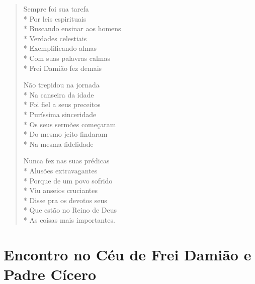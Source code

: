 \begin{verse}
Sempre foi sua tarefa\\*
Por leis espirituais\\*
Buscando ensinar aos homens\\*
Verdades celestiais\\*
Exemplificando almas\\*
Com suas palavras calmas\\*
Frei Damião fez demais

Não trepidou na jornada\\*
Na canseira da idade\\*
Foi fiel a seus preceitos\\*
Puríssima sinceridade\\*
Os seus sermões começaram\\*
Do mesmo jeito findaram\\*
Na mesma fidelidade

Nunca fez nas suas prédicas\\*
Alusões extravagantes\\*
Porque de um povo sofrido\\*
Viu anseios cruciantes\\*
Disse pra os devotos seus\\*
Que estão no Reino de Deus\\*
As coisas mais importantes.
\end{verse}


\chapter{Encontro no Céu de Frei Damião e Padre Cícero}

